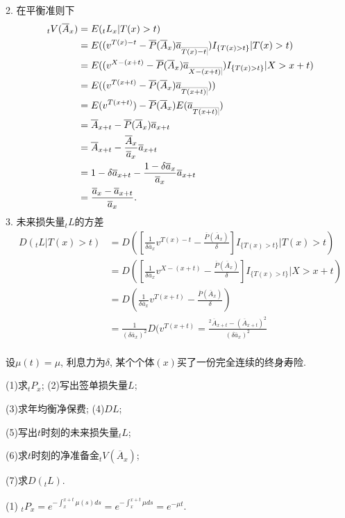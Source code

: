 \documentclass[a4paper,10pt]{ctexbook}
\makeatletter
\DeclareRobustCommand{\annu}[1]{_{%
    \def\arraystretch{0}%
    \setlength\arraycolsep{1pt}%
    \setlength\arrayrulewidth{.2pt}%
    \begin{array}[b]{@{}c|}\hline
        \\[\arraycolsep]%
        \scriptstyle #1%
    \end{array}%
}}
\makeatother
\begin{document}
2. 在平衡准则下
\begin{align*}
    _tV(\overline A_x) & =E({}_tL_x|T(x)>t)                                                                                \\
                       & =E((v^{T(x)-t}-\overline{P}( \overline{A}_x )\overline a_{\annu {T(x)-t}})I_{\{T(x)>t\}}|T(x)>t)  \\
                       & =E((v^{X-(x+t)}-\overline{P}( \overline{A}_x )\overline a_{\annu {X-(x+t)}})I_{\{T(x)>t\}}|X>x+t) \\
                       & =E((v^{T(x+t)}-\overline{P}( \overline{A}_x )\overline a_{\annu {T(x+t)}}))                       \\
                       & =E(v^{T(x+t)})-\overline{P}( \overline{A}_x )E(\overline a_{\annu {T(x+t)}})                      \\
                       & =\overline A_{x+t}-\overline{P}( \overline{A}_x )\overline a_{x+t}                                \\
                       & =\overline A_{x+t}-\frac{\overline A_x}{\overline a_x}\overline a_{x+t}                           \\
                       & =1-\delta\overline a_{x+t}-\frac{1-\delta \overline a_x}{\overline a_x}\overline a_{x+t}          \\
                       & =\frac{\overline a_x-\overline a_{x+t}}{\overline a_x}.
\end{align*}
3. 未来损失量$_tL$的方差
\begin{align*}
    D(_tL|T(x)>t) & =D([\frac{1}{\delta\overline{a}_x}v^{T(x)-t}-\frac{\overline{P}( \overline{A}_x )}{\delta}]I_{\{T(x)>t\}}|T(x)>t)        \\
                  & =D([\frac{1}{\delta\overline{a}_x}v^{X-(x+t)}-\frac{\overline{P}( \overline{A}_x )}{\delta}]I_{\{T(x)>t\}}|X>x+t)        \\
                  & =D(\frac{1}{\delta\overline{a}_x}v^{T(x+t)}-\frac{\overline{P}( \overline{A}_x )}{\delta})                               \\
                  & =\frac{1}{(\delta\overline a_x)^2}D(v^{T(x+t)}=\frac{^2\overline A_{x+t}-(\overline A_{x+t})^2}{(\delta\overline a_x)^2} \\\end{align*}

\begin{example}
    设$\mu(t)=\mu$, 利息力为$\delta$, 某个个体$(x)$买了一份完全连续的终身寿险.

    (1)求$_tP_x$; (2)写出签单损失量$L$;

    (3)求年均衡净保费; (4)$DL$;

    (5)写出$t$时刻的未来损失量${}_tL$;

    (6)求$t$时刻的净准备金$_tV(\overline A_x)$;

    (7)求$D({}_tL).$

\end{example}
\solution
(1) $_tP_x=e^{-\int_x^{x+t}\mu(s)ds}=e^{-\int_x^{x+t}\mu ds}=e^{-\mu t}.$
\end{document}
